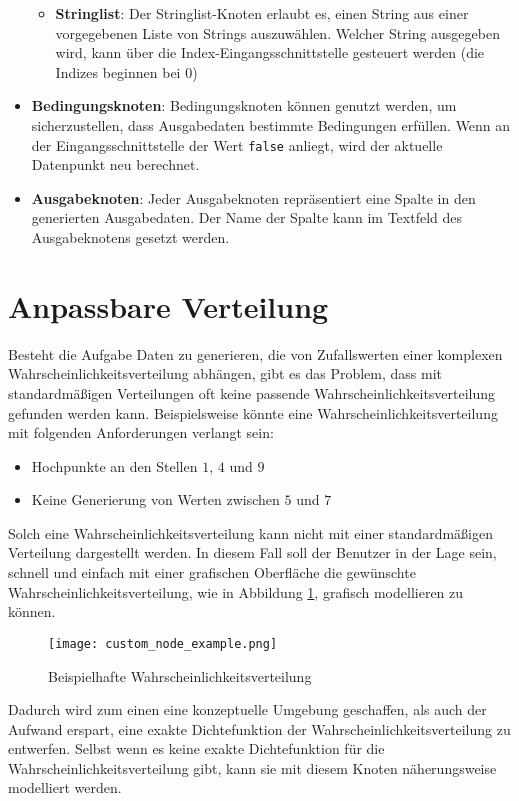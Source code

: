 \begin{itemize}
\begin{itemize}
        \item \textbf{Stringlist}: Der Stringlist-Knoten erlaubt es, einen String aus einer vorgegebenen Liste von Strings auszuwählen. Welcher String ausgegeben wird, kann über die Index-Eingangsschnittstelle gesteuert werden (die Indizes beginnen bei 0)
    \end{itemize}
    \item \textbf{Bedingungsknoten}: Bedingungsknoten können genutzt werden, um sicherzustellen, dass Ausgabedaten bestimmte Bedingungen erfüllen. Wenn an der Eingangsschnittstelle der Wert \texttt{false} anliegt, wird der aktuelle Datenpunkt neu berechnet.
    \item \textbf{Ausgabeknoten}: Jeder Ausgabeknoten repräsentiert eine Spalte in den generierten Ausgabedaten. Der Name der Spalte kann im Textfeld des Ausgabeknotens gesetzt werden.
\end{itemize}

\section{Anpassbare Verteilung}
\label{sec:anpassbareverteilung}

Besteht die Aufgabe Daten zu generieren, die von Zufallswerten einer komplexen Wahrscheinlichkeitsverteilung abhängen, gibt es das Problem, dass mit standardmäßigen Verteilungen oft keine passende Wahrscheinlichkeitsverteilung gefunden werden kann. Beispielsweise könnte eine Wahrscheinlichkeitsverteilung mit folgenden Anforderungen verlangt sein:
\begin{itemize}
    \item Hochpunkte an den Stellen $1$, $4$ und $9$
    \item Keine Generierung von Werten zwischen $5$ und $7$
\end{itemize}
Solch eine Wahrscheinlichkeitsverteilung kann nicht mit einer standardmäßigen Verteilung dargestellt werden. In diesem Fall soll der Benutzer in der Lage sein, schnell und einfach mit einer grafischen Oberfläche die gewünschte Wahrscheinlichkeitsverteilung, wie in Abbildung \ref{fig:customnodeexample}, grafisch modellieren zu können.
\begin{figure}[H]
    \centering
    \texttt{[image: custom\_node\_example.png]}
    \caption{Beispielhafte Wahrscheinlichkeitsverteilung}
    \label{fig:customnodeexample}
\end{figure}
Dadurch wird zum einen eine konzeptuelle Umgebung geschaffen, als auch der Aufwand erspart, eine exakte Dichtefunktion der Wahrscheinlichkeitsverteilung zu entwerfen. Selbst wenn es keine exakte Dichtefunktion für die Wahrscheinlichkeitsverteilung gibt, kann sie mit diesem Knoten näherungsweise modelliert werden. 

